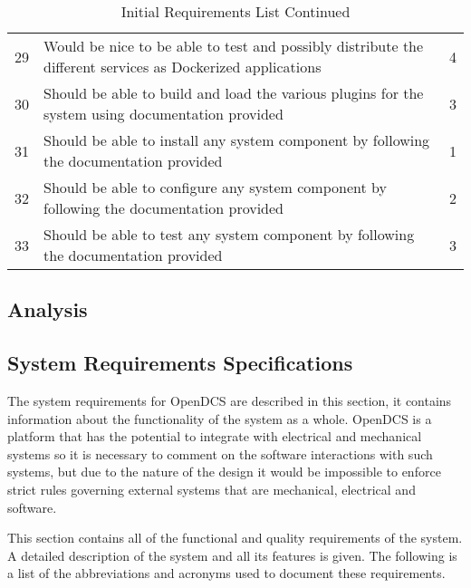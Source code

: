 \begin{table}[H]
\begin{tabular}{l p{11cm} p{3cm}}
        29 & Would be nice to be able to test and possibly distribute the different services as Dockerized applications & 4 \\
        30 & Should be able to build and load the various plugins for the system using documentation provided & 3 \\
        31 & Should be able to install any system component by following the documentation provided & 1 \\
        32 & Should be able to configure any system component by following the documentation provided & 2 \\
        33 & Should be able to test any system component by following the documentation provided & 3 \\
        \bottomrule
      \end{tabular}
      \caption{Initial Requirements List Continued}\label{tab:requirements}
    \end{table}

  \subsection{Analysis}\label{sec:req-analyze}

  \subsection{System Requirements Specifications}\label{sec:req-srs}

    The system requirements for OpenDCS are described in this section, it
    contains information about the functionality of the system as a whole.
    OpenDCS is a platform that has the potential to integrate with electrical
    and mechanical systems so it is necessary to comment on the software
    interactions with such systems, but due to the nature of the design it
    would be impossible to enforce strict rules governing external systems
    that are mechanical, electrical and software.

    This section contains all of the functional and quality requirements of
    the system. A detailed description of the system and all its features is
    given. The following is a list of the abbreviations and acronyms used to
    document these requirements.


